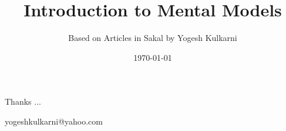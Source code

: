 \documentclass[xcolor=dvipsnames,compress,t,pdf]{beamer}
\title[\hspace{4cm} \insertframenumber /\inserttotalframenumber]
{Introduction to Mental Models}
\subtitle[]{Based on Articles in Sakal by Yogesh Kulkarni}
\date[2020]{\today}
\begin{document}
\begin{frame}
\titlepage
\end{frame}


\begin{frame}[c]{}
Thanks ...

\vspace{5mm}
yogeshkulkarni@yahoo.com
\end{frame}
\end{document}

